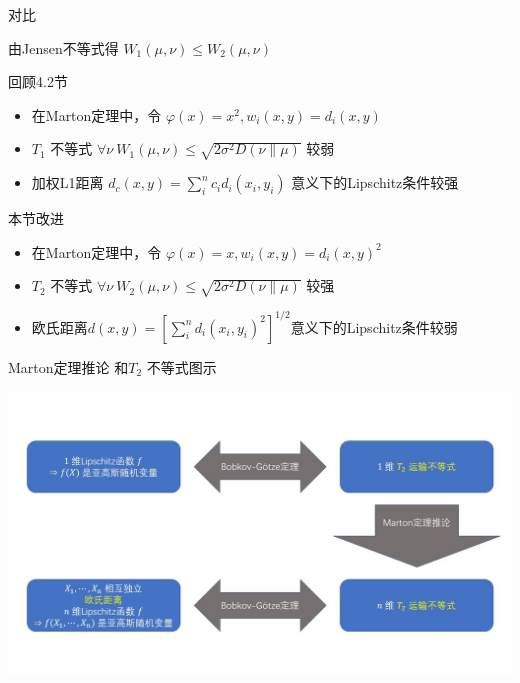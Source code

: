 \documentclass{beamer}
\begin{document}
\begin{frame}{对比}

由Jensen不等式得 $W_1(\mu, \nu) \le W_2(\mu, \nu)$

回顾4.2节

\begin{itemize}
    \item 在Marton定理中，令 $\varphi(x)=x^2, w_i(x,y) = d_i(x,y)$
    \item $T_1$ 不等式 $\forall \nu\ W_1(\mu, \nu) \le \sqrt{2\sigma^{2}D(\nu\|\mu)}$ 较弱
    \item 加权L1距离 $d_c(x, y) = \sum_i^n c_i d_i(x_i, y_i)$ 意义下的Lipschitz条件较强
\end{itemize}

本节改进

\begin{itemize}
    \item 在Marton定理中，令 $\varphi(x)=x, w_i(x,y) = d_i(x,y)^2$
    \item $T_2$ 不等式 $\forall \nu\ W_2(\mu, \nu) \le \sqrt{2\sigma^{2}D(\nu\|\mu)}$ 较强
    \item 欧氏距离$d(x, y) = \left[\sum_i^n d_i(x_i, y_i)^2\right]^{1/2}$意义下的Lipschitz条件较弱
\end{itemize}

\end{frame}

\begin{frame}{Marton定理推论 和$T_2$ 不等式图示}
\begin{center}
    \includegraphics[width=1.0\textwidth]{figures/structure02.JPG}
\end{center}
\end{frame}
\end{document}
